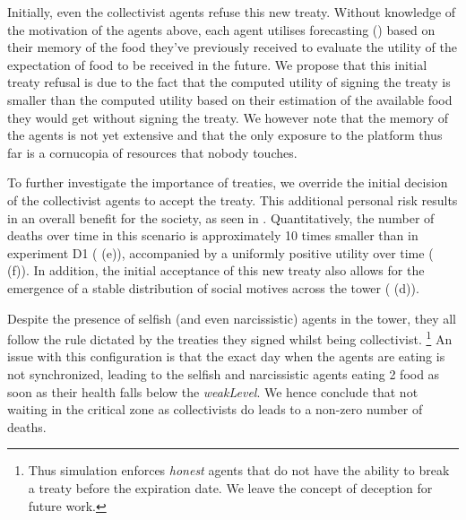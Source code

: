 Initially, even the collectivist agents refuse this new treaty. Without knowledge of the motivation of the agents above, each agent utilises forecasting () based on their memory of the food they've previously received to evaluate the utility of the expectation of food to be received in the future. We propose that this initial treaty refusal is due to the fact that the computed utility of signing the treaty is smaller than the computed utility based on their estimation of the available food they would get without signing the treaty. We however note that the memory of the agents is not yet extensive and that the only exposure to the platform thus far is a cornucopia of resources that nobody touches. 


To further investigate the importance of treaties, we override the initial decision of the collectivist agents to accept the treaty. This additional personal risk results in an overall benefit for the society, as seen in . Quantitatively, the number of deaths over time in this scenario is approximately 10 times smaller than in experiment D1 ( (e)), accompanied by a uniformly positive utility over time ( (f)). In addition, the initial acceptance of this new treaty also allows for the emergence of a stable distribution of social motives across the tower ( (d)).

Despite the presence of selfish (and even narcissistic) agents in the tower, they all follow the rule dictated by the treaties they signed whilst being collectivist. \footnote{Thus simulation enforces \textit{honest} agents that do not have the ability to break a treaty before the expiration date. We leave the concept of deception for future work.} An issue with this configuration is that the exact day when the agents are eating is not synchronized, leading to the selfish and narcissistic agents eating 2 food as soon as their health falls below the \textit{weakLevel}. We hence conclude that not waiting in the critical zone as collectivists do leads to a non-zero number of deaths.

